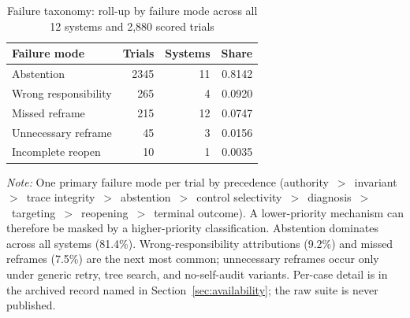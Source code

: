 \begin{table}[t]
  \centering
  \caption{Failure taxonomy: roll-up by failure mode across all 12 systems and 2,880 scored trials}
  \label{tab:P1-T3}
  \small
  \begin{tabular}{lrrr}
    \toprule
    Failure mode & Trials & Systems & Share \\
    \midrule
    Abstention & 2345 & 11 & 0.8142 \\
    Wrong responsibility & 265 & 4 & 0.0920 \\
    Missed reframe & 215 & 12 & 0.0747 \\
    Unnecessary reframe & 45 & 3 & 0.0156 \\
    Incomplete reopen & 10 & 1 & 0.0035 \\
    \bottomrule
  \end{tabular}
  \par\smallskip
  \textit{Note:} One primary failure mode per trial by precedence (authority~$>$~invariant~$>$~trace integrity~$>$~abstention~$>$~control selectivity~$>$~diagnosis~$>$~targeting~$>$~reopening~$>$~terminal outcome). A lower-priority mechanism can therefore be masked by a higher-priority classification. Abstention dominates across all systems (81.4\%). Wrong-responsibility attributions (9.2\%) and missed reframes (7.5\%) are the next most common; unnecessary reframes occur only under generic retry, tree search, and no-self-audit variants. Per-case detail is in the archived record named in Section~\ref{sec:availability}; the raw suite is never published.
\end{table}
